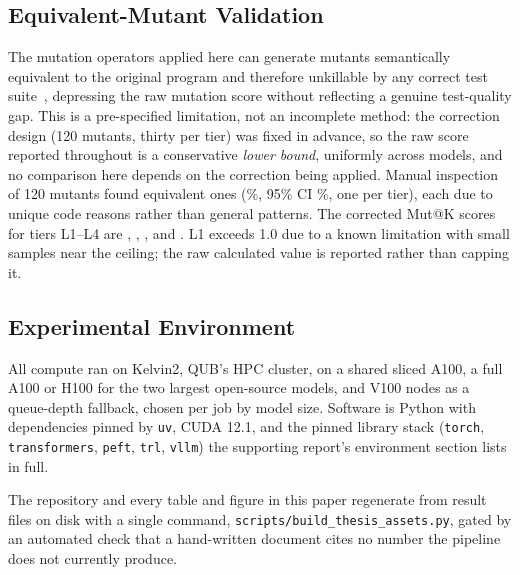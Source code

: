 \subsection{Equivalent-Mutant Validation}
\label{sec:methods-equivmut}
The mutation operators applied here can generate mutants semantically equivalent to the original program and therefore unkillable by any correct test suite~\cite{jia2011mutation}, depressing the raw mutation score without reflecting a genuine test-quality gap. This is a pre-specified limitation, not an incomplete method: the correction design (120 mutants, thirty per tier) was fixed in advance, so the raw score reported throughout is a conservative \emph{lower bound}, uniformly across models, and no comparison here depends on the correction being applied. Manual inspection of 120 mutants found \HTwoEquivMutTotal{} equivalent ones (\HTwoEquivMutRate{}\%, 95\% CI \HTwoEquivMutRateCI{}\%, one per tier), each due to unique code reasons rather than general patterns. The corrected Mut@K scores for tiers L1--L4 are \HTwoValidatedLOneMutK{}, \HTwoValidatedLTwoMutK{}, \HTwoValidatedLThreeMutK{}, and \HTwoValidatedLFourMutK{}. L1 exceeds 1.0 due to a known limitation with small samples near the ceiling; the raw calculated value is reported rather than capping it. %

\subsection{Experimental Environment}
\label{sec:methods-environment}
All compute ran on Kelvin2, QUB's HPC cluster, on a shared sliced A100, a full A100 or H100 for the two largest open-source models, and V100 nodes as a queue-depth fallback, chosen per job by model size. Software is Python \PyVersion{} with dependencies pinned by \texttt{uv}, CUDA 12.1, and the pinned library stack (\texttt{torch}, \texttt{transformers}, \texttt{peft}, \texttt{trl}, \texttt{vllm}) the supporting report's environment section lists in full. %

The repository and every table and figure in this paper regenerate from result files on disk with a single command, \texttt{scripts/build\_thesis\_assets.py}, gated by an automated check that a hand-written document cites no number the pipeline does not currently produce.

